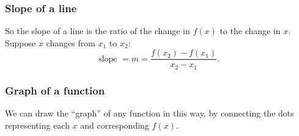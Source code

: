 \documentclass[xcolor=pdftex,dvipsnames]{beamer}
\begin{document}
\begin{frame}
\frametitle{Slope of a line}
So the slope of a line is the ratio of the change in $f(x)$ to the
change in $x$. Suppose $x$ changes from $x_1$ to $x_2$:
\[
\text{slope } =m=\frac{f(x_2)-f(x_1)}{x_2-x_1}.
\]
\end{frame}


\begin{frame}\frametitle{Graph of a function}
We can draw the ``graph'' of any function in this way, by connecting
the dots representing each $x$ and corresponding $f(x)$.

\begin{center}
\end{center}
\end{frame}
\end{document}
